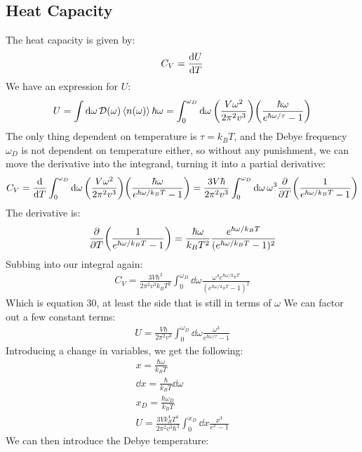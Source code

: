 \documentclass[12pt]{article}
\newcommand{\D}{\mathcal{D}}
\begin{document}
\subsection*{Heat Capacity}
The heat capacity is given by:
\begin{align*}
  C_V=\dv{U}{T}
\end{align*}
We have an expression for $U$:
\begin{align*}
  U=\int\dd{\omega}\D(\omega)\ev{n(\omega)}\hbar\omega
  =\int_0^{\omega_D}\dd{\omega}\qty(\frac{V\omega^2}{2\pi^2v^3})
  \qty(\frac{\hbar\omega}{e^{\hbar\omega/\tau}-1})
\end{align*}
The only thing dependent on temperature is $\tau=k_BT$, and the Debye frequency $\omega_D$ is not dependent on temperature either, so without any punishment, we can move the derivative into the integrand, turning it into a partial derivative:
\begin{align*}
  C_V=\dv{T}\int_0^{\omega_D}\dd{\omega}\qty(\frac{V\omega^2}{2\pi^2v^3})
  \qty(\frac{\hbar\omega}{e^{\hbar\omega/k_BT}-1})
  =\frac{3V\hbar}{2\pi^2v^3}\int_0^{\omega_D}\dd{\omega}\omega^3\pdv{T}
  \qty(\frac{1}{e^{\hbar\omega/k_BT}-1})
\end{align*}
The derivative is:
\begin{align*}
  \pdv{T}\qty(\frac{1}{e^{\hbar\omega/k_BT}-1})=\frac{\hbar\omega}{k_BT^2}
  \frac{e^{\hbar\omega/k_BT}}{(e^{\hbar\omega/k_BT}-1)^2}
\end{align*}
Subbing into our integral again:
\begin{align*}
  C_V=\frac{3V\hbar^2}{2\pi^2v^3k_BT^2}\int_0^{\omega_D}\dd{\omega}
  \frac{\omega^4e^{\hbar\omega/k_BT}}{(e^{\hbar\omega/k_BT}-1)^2}
\end{align*}
Which is equation 30, at least the side that is still in terms of $\omega$
\iffalse %
We can factor out a few constant terms:
\begin{align*}
  U=\frac{V\hbar}{2\pi^2v^3}\int_0^{\omega_D}\dd{\omega}\frac{\omega^3}
  {e^{\hbar\omega/\tau}-1}
\end{align*}
Introducing a change in variables, we get the following:
\begin{gather*}
  x=\frac{\hbar\omega}{k_BT}\\
  \dd{x}=\frac{\hbar}{k_BT}\dd{\omega}\\
  x_D=\frac{\hbar\omega_D}{k_BT}\\
  U=\frac{3Vk^4_BT^4}{2\pi^2v^3\hbar^3}\int_0^{x_D}\dd{x}\frac{x^3}{e^x-1}
\end{gather*}
We can then introduce the Debye temperature:
\end{document}
